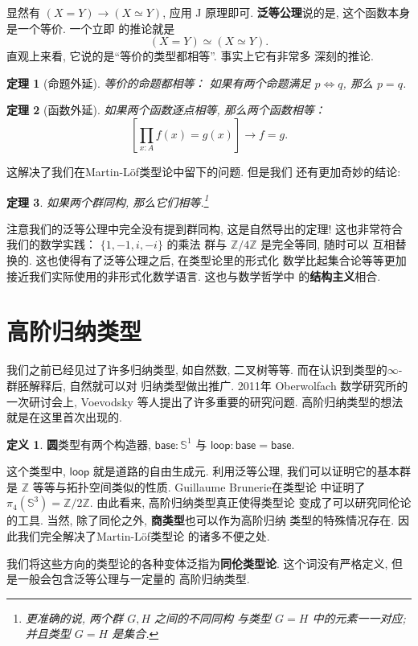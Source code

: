 \documentclass[UTF8]{ctexbook}
\newcommand{\cons}[1]{\textsf{#1}}
\theoremstyle{plain}
\newtheorem{theorem}{定理}[chapter]
\theoremstyle{definition}
\newtheorem{definition}{定义}[chapter]
\theoremstyle{remark}
\begin{document}
显然有 \((X = Y) \to (X \simeq Y)\), 应用 J 原理即可.
\textbf{泛等公理}说的是, 这个函数本身是一个等价. 一个立即
的推论就是
\[(X = Y) \simeq (X \simeq Y).\]
直观上来看, 它说的是“等价的类型都相等”. 事实上它有非常多
深刻的推论.
\begin{theorem}[命题外延]
等价的命题都相等： 如果有两个命题满足
\(p \iff q\), 那么 \(p = q\).
\end{theorem}
\begin{theorem}[函数外延]
如果两个函数逐点相等, 那么两个函数相等：
\[\left[\prod_{x:A} f(x) = g(x)\right] \to f = g.\]
\end{theorem}
这解决了我们在Martin-L\"of类型论中留下的问题. 但是我们
还有更加奇妙的结论:
\begin{theorem}
如果两个群同构, 那么它们相等.\footnote{更准确的说, 两个群 \(G, H\) 之间的不同同构
与类型 \(G = H\) 中的元素一一对应; 并且类型 \(G = H\) 是集合.}
\end{theorem}
注意我们的泛等公理中完全没有提到群同构, 这是自然导出的定理!
这也非常符合我们的数学实践： \(\{1,-1,i,-i\}\) 的乘法
群与 \(\mathbb Z/4\mathbb Z\) 是完全等同, 随时可以
互相替换的. 这也使得有了泛等公理之后, 在类型论里的形式化
数学比起集合论等等更加接近我们实际使用的非形式化数学语言.
这也与数学哲学中
的\textbf{结构主义}相合.\cite{awodey:2013:structuralism}

\section{高阶归纳类型}
我们之前已经见过了许多归纳类型, 如自然数, 二叉树等等.
而在认识到类型的\(\infty\)-群胚解释后, 自然就可以对
归纳类型做出推广. 2011年 Oberwolfach 数学研究所的
一次研讨会上, Voevodsky 等人提出了许多重要的研究问题.
高阶归纳类型的想法就是在这里首次出现的.

\begin{definition}
\textbf{圆}类型有两个构造器, \(\cons{base} : \mathbb S^1\)
与 \(\cons{loop} : \cons{base} = \cons{base}\).
\end{definition}
这个类型中, \(\cons{loop}\) 就是道路的自由生成元.
利用泛等公理, 我们可以证明它的基本群是 \(\mathbb Z\)
等等与拓扑空间类似的性质. Guillaume Brunerie\cite{brunerie:2016:number}在类型论
中证明了 \(\pi_4(\mathbb S^3) = \mathbb Z / 2\mathbb Z\).
由此看来, 高阶归纳类型真正使得类型论
变成了可以研究同伦论的工具.
当然, 除了同伦之外, \textbf{商类型}也可以作为高阶归纳
类型的特殊情况存在. 因此我们完全解决了Martin-L\"of类型论
的诸多不便之处.

我们将这些方向的类型论的各种变体泛指为\textbf{同伦类型论}.
这个词没有严格定义, 但是一般会包含泛等公理与一定量的
高阶归纳类型.
\end{document}
